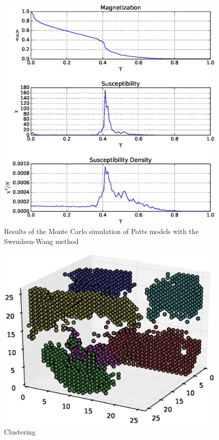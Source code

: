\documentclass{article} %
\begin{document}
\begin{figure}[H]
  \begin{center}
    \includegraphics[width=\textwidth]{img/phase_analysis_subset_2_v2.eps}
  \end{center}
  \caption{Results of the Monte Carlo simulation of Potts models with the Swendsen-Wang method}
	\label{fig:phase}
\end{figure}

\begin{figure}[H]
  \begin{center}
    \includegraphics[width=\textwidth]{img/clustering.eps}
  \end{center}
  \caption{Clustering}
  \label{fig:clustering}
\end{figure}
\end{document}
